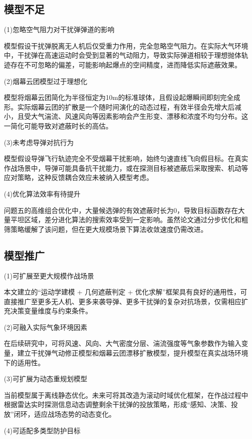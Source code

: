 \documentclass[12pt,a4paper]{article}
\begin{document}
	\subsection{模型不足}
	
	
	(1)忽略空气阻力对干扰弹弹道的影响
	
	模型假设干扰弹脱离无人机后仅受重力作用，完全忽略空气阻力。在实际大气环境中，干扰弹在高速运动时会受到显著的气动阻力，导致实际弹道相较于理想抛体轨迹存在不可忽略的偏差，可能影响起爆点的空间精度，进而降低实际遮蔽效果。
	
	(2)烟幕云团模型过于理想化
	
	模型将烟幕云团简化为半径恒定为10m的标准球体，且假设起爆瞬间即刻完全成形。实际烟幕云团的扩散是一个随时间演化的动态过程，有效半径会先增大后减小，且受大气湍流、风速风向等因素影响会产生形变、漂移和浓度不均匀分布。这一简化可能导致对遮蔽时长的高估。
	
	(3)未考虑导弹对抗行为
	
	模型假设导弹飞行轨迹完全不受烟幕干扰影响，始终匀速直线飞向假目标。在真实作战场景中，导弹可能具备抗干扰能力，或在探测目标被遮蔽后采取搜索、机动等应对策略，这种反馈耦合效应未被纳入模型考虑。
	
	(4)优化算法效率有待提升
	
	问题五的高维组合优化中，大量候选弹的有效遮蔽时长为0，导致目标函数存在大量平坦区域，差分进化算法的搜索效率受到一定影响。虽然论文通过分步优化和粗筛策略缓解了该问题，但在更大规模场景下算法收敛速度仍需改进。
	
	
	\subsection{模型推广}
	(1)可扩展至更大规模作战场景
	
	本文建立的“运动学建模 + 几何遮蔽判定 + 优化求解”框架具有良好的通用性，可直接推广至更多无人机、更多来袭导弹、更多干扰弹的复杂对抗场景，仅需相应扩充决策变量维度与约束条件。
	
	(2)可融入实际气象环境因素
	
	在后续研究中，可将风速、风向、大气密度分层、湍流强度等气象参数作为输入变量，建立干扰弹气动修正模型和烟幕云团漂移扩散模型，提升模型在真实战场环境下的适用性。
	
	(3)可扩展为动态重规划模型
	
	当前模型属于离线静态优化。未来可将其改造为滚动时域优化框架，在作战过程中根据雷达实时探测信息动态调整剩余干扰弹的投放策略，形成“感知、决策、投放”闭环，适应战场态势的动态变化。
	
	(4)可适配多类型防护目标
	
\end{document}
